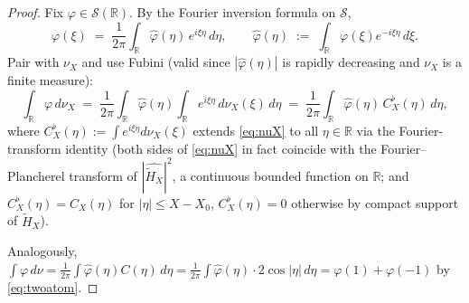 \documentclass[11pt]{article}
\theoremstyle{definition}
\theoremstyle{remark}
\begin{document}
\begin{proof}
Fix $\varphi\in\mathcal{S}(\mathbb{R})$. By the Fourier inversion formula on $\mathcal{S}$,
\[
  \varphi(\xi)\;=\;\frac{1}{2\pi}\int_{\mathbb{R}}\widehat\varphi(\eta)\,e^{i\xi\eta}\,d\eta,\qquad\widehat\varphi(\eta)\;:=\;\int_{\mathbb{R}}\varphi(\xi)e^{-i\xi\eta}\,d\xi.
\]
Pair with $\nu_X$ and use Fubini (valid since $|\widehat\varphi(\eta)|$ is rapidly decreasing and $\nu_X$ is a finite measure):
\[
  \int_{\mathbb{R}}\varphi\,d\nu_X
  \;=\;\frac{1}{2\pi}\int_{\mathbb{R}}\widehat\varphi(\eta)\int_{\mathbb{R}}e^{i\xi\eta}\,d\nu_X(\xi)\,d\eta
  \;=\;\frac{1}{2\pi}\int_{\mathbb{R}}\widehat\varphi(\eta)\,C_X^{\flat}(\eta)\,d\eta,
\]
where $C_X^{\flat}(\eta):=\int e^{i\xi\eta}d\nu_X(\xi)$ extends \eqref{eq:nuX} to all $\eta\in\mathbb{R}$ via the Fourier-transform identity (both sides of \eqref{eq:nuX} in fact coincide with the Fourier--Plancherel transform of $|\widehat{\widetilde H_X}|^2$, a continuous bounded function on $\mathbb{R}$; and $C_X^{\flat}(\eta)=C_X(\eta)$ for $|\eta|\le X-X_0$, $C_X^{\flat}(\eta)=0$ otherwise by compact support of $\widetilde H_X$).

Analogously, $\int\varphi\,d\nu=\frac{1}{2\pi}\int\widehat\varphi(\eta)C(\eta)\,d\eta=\frac{1}{2\pi}\int\widehat\varphi(\eta)\cdot 2\cos|\eta|\,d\eta=\varphi(1)+\varphi(-1)$ by \eqref{eq:twoatom}.


\end{proof}
\end{document}
